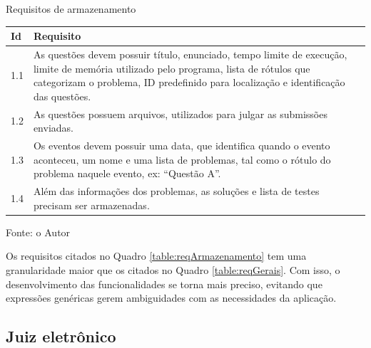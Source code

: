\begin{quadro}
    \caption{Requisitos de armazenamento}
    \centering
    \label{table:reqArmazenamento}
    \begin{threeparttable}
    \begin{tabular}{ |p{0.6cm}|p{10cm}|  }
        \hline
        
        \textbf{Id} & 
        \textbf{Requisito} \\
        \hline
        
        1.1 & As questões devem possuir título, enunciado, tempo limite de execução, limite de memória utilizado pelo programa, lista de rótulos que categorizam o problema, ID predefinido para localização e identificação das questões. \\
        \hline
        
        1.2 & As questões possuem arquivos, utilizados para julgar as submissões enviadas.\footnotemark 
        \\
        \hline
        
        1.3 & Os eventos devem possuir uma data, que identifica quando o evento aconteceu, um nome e uma lista de problemas, tal como o rótulo do problema naquele evento, ex: ``Questão A''.  \\ 
        \hline
        
        1.4 & Além das informações dos problemas, as soluções e lista de testes precisam ser armazenadas.  \\
        \hline
    \end{tabular}
    \medskip
    \begin{tablenotes}
        \centering
        \item Fonte: o Autor
    \end{tablenotes}
    \end{threeparttable}
    
\end{quadro}

Os requisitos citados no Quadro \ref{table:reqArmazenamento} tem uma granularidade maior que os citados no Quadro \ref{table:reqGerais}. Com isso, o desenvolvimento das funcionalidades se torna mais preciso, evitando que expressões genéricas gerem ambiguidades com as necessidades da aplicação.

\subsection{Juiz eletrônico}
\label{subsec:juiz}

